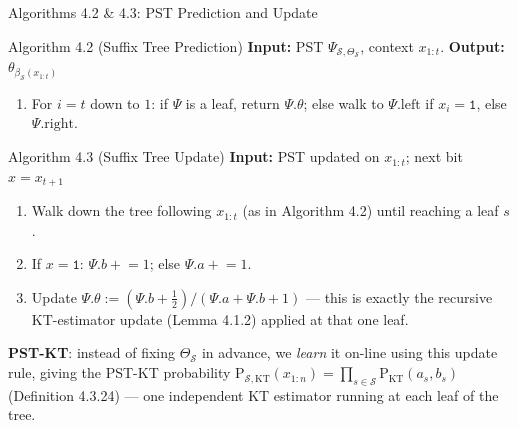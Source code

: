 \documentclass[aspectratio=169,10pt]{beamer}
\newcommand{\PKT}{\mathrm{P}_{\mathrm{KT}}}
\begin{document}
\begin{frame}{Algorithms 4.2 \& 4.3: PST Prediction and Update}
\begin{block}{Algorithm 4.2 (Suffix Tree Prediction)}
\textbf{Input:} PST $\Psi_{\mathcal S,\Theta_{\mathcal S}}$, context $x_{1:t}$.\quad
\textbf{Output:} $\theta_{\beta_{\mathcal S}(x_{1:t})}$
\begin{enumerate}
\item For $i=t$ down to $1$: if $\Psi$ is a leaf, return $\Psi.\theta$; else walk to
$\Psi.\mathrm{left}$ if $x_i=\mathtt1$, else $\Psi.\mathrm{right}$.
\end{enumerate}
\end{block}

\begin{block}{Algorithm 4.3 (Suffix Tree Update)}
\textbf{Input:} PST updated on $x_{1:t}$; next bit $x=x_{t+1}$
\begin{enumerate}
\item Walk down the tree following $x_{1:t}$ (as in Algorithm 4.2) until reaching a leaf $s$.
\item If $x=\mathtt1$: $\Psi.b \mathrel{+}= 1$; else $\Psi.a\mathrel{+}=1$.
\item Update $\Psi.\theta := (\Psi.b+\tfrac12)/(\Psi.a+\Psi.b+1)$ — this is exactly the
recursive KT-estimator update (Lemma 4.1.2) applied at that one leaf.
\end{enumerate}
\end{block}
\textbf{PST-KT}: instead of fixing $\Theta_{\mathcal S}$ in advance, we \emph{learn} it
on-line using this update rule, giving the PST-KT probability
$\mathrm{P}_{\mathcal S,\mathrm{KT}}(x_{1:n}) = \prod_{s\in\mathcal S}\PKT(a_s,b_s)$
(Definition 4.3.24) — one independent KT estimator running at each leaf of the tree.
\end{frame}
\end{document}
